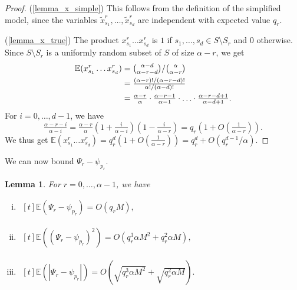 \documentclass{article}
\theoremstyle{plain}
\theoremstyle{remark}
\theoremstyle{plain}
\newtheorem{lemma}[theorem]{Lemma}
\numberwithin{equation}{section}
\begin{document}
	\begin{proof}
		(\ref{lemma_x_simple}) This follows from the definition of the simplified model, since the variables $\widetilde{x}_{s_1}^r,\ldots,\widetilde{x}_{s_d}^r$ are independent with expected value $q_r$.
		
		(\ref{lemma_x_true}) The product $x_{s_1}^r\ldots x_{s_d}^r$ is $1$ if $s_1,\ldots,s_d\in S\setminus S_r$ and $0$ otherwise. Since $S\setminus S_r$ is a uniformly random subset of $S$ of size $\alpha-r$, we get
		\begin{align}
			\mathbb{E}(x_{s_1}^r\ldots x_{s_d}^r)
			&=\tbinom{\alpha-d}{\alpha-r-d}/\tbinom{\alpha}{\alpha-r}
			\\&=\tfrac{(\alpha-r)!/(\alpha-r-d)!}{\alpha!/(\alpha-d)!}
			\\&=\tfrac{\alpha-r}{\alpha}\cdot\tfrac{\alpha-r-1}{\alpha-1}\cdot\ldots\cdot\tfrac{\alpha-r-d+1}{\alpha-d+1}.
		\end{align}
		For $i=0,\ldots,d-1$, we have $$\tfrac{\alpha-r-i}{\alpha-i}=\tfrac{\alpha-r}{\alpha}\left(1+\tfrac{i}{\alpha-i}\right)\left(1-\tfrac{i}{\alpha-r}\right)=q_r\left(1+O(\tfrac1{\alpha-r})\right).$$ We thus get $\mathbb{E}(x_{s_1}^r\ldots x_{s_d}^r)=q_r^d(1+O(\tfrac1{\alpha-r}))=q_r^d+O(q_r^{d-1}/\alpha)$.
	\end{proof}
	
	We can now bound $\Psi_r-\psi_{p_r}$.
	
	\begin{lemma}\label{lemma_psipsi}
		For $r=0,\ldots,\alpha-1$, we have
		\begin{enumerate}[(i)]
			\item\label{lemma_psipsi_1} $\begin{aligned}[t]
				\mathbb{E}(\Psi_r-\psi_{p_r})=O(q_rM),
			\end{aligned}$
			\item\label{lemma_psipsi_2} $\begin{aligned}[t]
				\mathbb{E}((\Psi_r-\psi_{p_r})^2)=O(q_r^3\alpha M^2+q_r^2\alpha M),
			\end{aligned}$
			\item\label{lemma_psipsi_abs} $\begin{aligned}[t]
				\mathbb{E}(|\Psi_r-\psi_{p_r}|)=O(\sqrt{q_r^3\alpha M^2}+\sqrt{q_r^2\alpha M}).
			\end{aligned}$
		\end{enumerate}
	\end{lemma}
	
\end{document}
